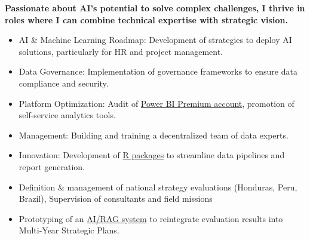 \documentclass[10pt,a4paper,ragged2e,withhyper]{altacv}
\begin{document}
\begin{paracol}{2}

\textbf{Passionate about AI's potential to solve complex challenges, I thrive in roles where I can combine technical expertise with strategic vision.}


\begin{itemize}

\item  AI & Machine Learning Roadmap: Development of strategies to deploy AI solutions, particularly for HR and project management.

\item  Data Governance: Implementation of governance frameworks to ensure data compliance and security.

\item  Platform Optimization: Audit of \href{https://github.com/iom/powerBI_audit}{Power BI Premium account}, promotion of self-service analytics tools.

\item Management: Building and training a decentralized team of data experts.

\item Innovation: Development of \href{https://github.com/orgs/iom/repositories?q=language%3AR}{R packages} to streamline data pipelines and report generation.

\end{itemize}

\divider

\begin{itemize}
\item Definition & management of national strategy evaluations (Honduras, Peru, Brazil), Supervision of consultants and field missions
\item Prototyping of an \href{https://edouard-legoupil.github.io/rag_extraction/}{AI/RAG system} to reintegrate evaluation results into Multi-Year Strategic Plans.
\end{itemize}

\divider


\end{paracol}
\end{document}
